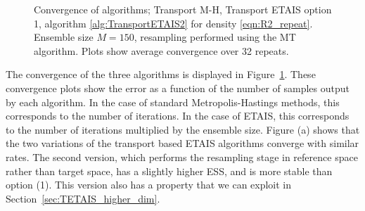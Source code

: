 \documentclass[final]{siamltex}
\newcommand{\edit}[1]{{\color{red} #1}}
\begin{document}
\begin{figure}[!ht]
\centering
{}
\caption{Convergence of algorithms; Transport M-H,
  Transport ETAIS option 1, algorithm \ref{alg:TransportETAIS2} for
  density \eqref{eqn:R2_repeat}. Ensemble size $M=150$, resampling
  performed using the MT algorithm. \edit{Plots show average
    convergence over 32 repeats.}}
\label{fig:R2_l2_convergence}
\end{figure}

The convergence of the three algorithms is displayed in
Figure~\ref{fig:R2_l2_convergence}. \edit{These convergence plots show
  the error as a function of the number of samples output by each
  algorithm. In the case of standard Metropolis-Hastings methods, this
  corresponds to the number of iterations. In the case of ETAIS, this
  corresponds to the number of iterations multiplied by the ensemble
  size.} Figure (a) shows that the two
variations of the transport based ETAIS algorithms converge with
similar rates. The second version, which performs the resampling stage
in reference space rather than target space, has a slightly higher
ESS, and is more stable than option (1). This version also has a
property that we can exploit in Section~\ref{sec:TETAIS_higher_dim}.
\end{document}
